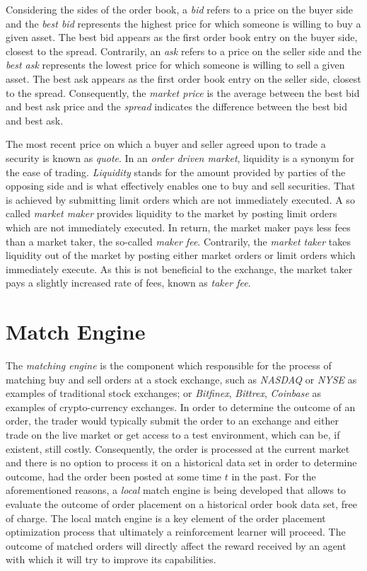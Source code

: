 Considering the sides of the order book, a \textit{bid} refers to a price on the buyer side and the \textit{best bid} represents the highest price for which someone is willing to buy a given asset.
The best bid appears as the first order book entry on the buyer side, closest to the spread.
Contrarily, an \textit{ask} refers to a price on the seller side and the \textit{best ask} represents the lowest price for which someone is willing to sell a given asset. 
The best ask appears as the first order book entry on the seller side, closest to the spread.
Consequently, the \textit{market price} is the average between the best bid and best ask price and the \textit{spread} indicates the difference between the best bid and best ask.

The most recent price on which a buyer and seller agreed upon to trade a security is known as \textit{quote}.
In an \textit{order driven market}, liquidity is a synonym for the ease of trading.
\textit{Liquidity} stands for the amount provided by parties of the opposing side and is what effectively enables one to buy and sell securities.
That is achieved by submitting limit orders which are not immediately executed.
A so called \textit{market maker} provides liquidity to the market by posting limit orders which are not immediately executed.
In return, the market maker pays less fees than a market taker, the so-called \textit{maker fee}.
Contrarily, the \textit{market taker} takes liquidity out of the market by posting either market orders or limit orders which immediately execute.
As this is not beneficial to the exchange, the market taker pays a slightly increased rate of fees, known as \textit{taker fee}.

\section{Match Engine}
\label{sec:match-engine}

The \textit{matching engine} is the component which responsible for the process of matching buy and sell orders at a stock exchange, such as \textit{NASDAQ} or \textit{NYSE} as examples of traditional stock exchanges; or \textit{Bitfinex}, \textit{Bittrex}, \textit{Coinbase} as examples of crypto-currency exchanges.
In order to determine the outcome of an order, the trader would typically submit the order to an exchange and either trade on the live market or get access to a test environment, which can be, if existent, still costly.
Consequently, the order is processed at the current market and there is no option to process it on a historical data set in order to determine outcome, had the order been posted at some time $t$ in the past.
For the aforementioned reasons, a \textit{local} match engine is being developed that allows to evaluate the outcome of order placement on a historical order book data set, free of charge.
The local match engine is a key element of the order placement optimization process that ultimately a reinforcement learner will proceed.
The outcome of matched orders will directly affect the reward received by an agent with which it will try to improve its capabilities.


